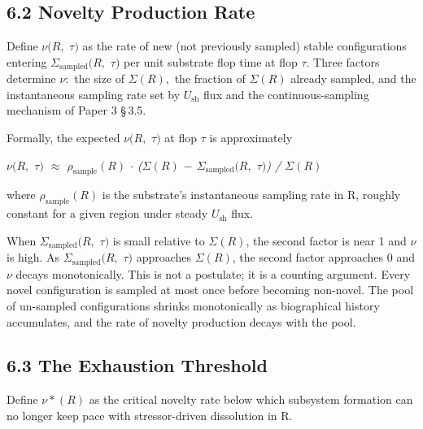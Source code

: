\documentclass[11pt,oneside]{report}
\theoremstyle{definition}
\theoremstyle{remark}
\begin{document}
\subsection*{6.2 Novelty Production Rate}

Define \ensuremath{\nu (R,} \ensuremath{\tau )} as the rate of new (not previously sampled) stable
configurations entering \ensuremath{\Sigma_{\mathrm{sampled}}(R,} \ensuremath{\tau )} per unit substrate flop time at
flop \ensuremath{\tau .} Three factors determine \ensuremath{\nu :} the size of \ensuremath{\Sigma (R),} the fraction of
\ensuremath{\Sigma (R)} already sampled, and the instantaneous sampling rate set by \ensuremath{U_{\mathrm{sh}}}
flux and the continuous-sampling mechanism of Paper 3 \S\,3.5.

Formally, the expected \ensuremath{\nu (R,} \ensuremath{\tau )} at flop \ensuremath{\tau} is approximately

\emph{\ensuremath{\nu (R,} \ensuremath{\tau )} \ensuremath{\approx} \ensuremath{\rho_{\mathrm{sample}}(R)} \ensuremath{\cdot} (\textbar \ensuremath{\Sigma (R)}\textbar{} \ensuremath{-}
\textbar \ensuremath{\Sigma_{\mathrm{sampled}}(R,} \ensuremath{\tau )}\textbar) / \textbar \ensuremath{\Sigma (R)}\textbar{}}

where \ensuremath{\rho_{\mathrm{sample}}(R)} is the substrate's instantaneous sampling rate in R,
roughly constant for a given region under steady \ensuremath{U_{\mathrm{sh}}} flux.

When \textbar \ensuremath{\Sigma_{\mathrm{sampled}}(R,} \ensuremath{\tau )}\textbar{} is small relative to
\textbar \ensuremath{\Sigma (R)}\textbar, the second factor is near 1 and \ensuremath{\nu} is high. As
\textbar \ensuremath{\Sigma_{\mathrm{sampled}}(R,} \ensuremath{\tau )}\textbar{} approaches \textbar \ensuremath{\Sigma (R)}\textbar,
the second factor approaches 0 and \ensuremath{\nu} decays monotonically. This is not a
postulate; it is a counting argument. Every novel configuration is
sampled at most once before becoming non-novel. The pool of un-sampled
configurations shrinks monotonically as biographical history
accumulates, and the rate of novelty production decays with the pool.

\subsection*{6.3 The Exhaustion Threshold}

Define \ensuremath{\nu *(R)} as the critical novelty rate below which subsystem
formation can no longer keep pace with stressor-driven dissolution in R.
\end{document}
